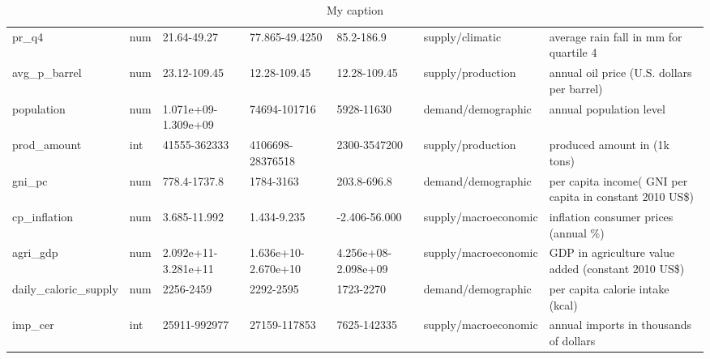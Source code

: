\documentclass[12pt,a4paper,english]{article}
\begin{document}
\begin{table}[!htbp]
\begin{adjustbox}{max width=\textwidth}
\begin{tabular}{lllllll}
pr\_q4                 & num      & 21.64-49.27         & 77.865-49.4250      & 85.2-186.9          & supply/climatic      & average rain fall in mm for quartile 4                   \\
avg\_p\_barrel         & num      & 23.12-109.45        & 12.28-109.45        & 12.28-109.45        & supply/production    & annual oil price (U.S. dollars per barrel)               \\
population             & num      & 1.071e+09-1.309e+09 & 74694-101716        & 5928-11630          & demand/demographic   & annual population level                                  \\
prod\_amount           & int      & 41555-362333        & 4106698-28376518    & 2300-3547200        & supply/production    & produced amount in (1k tons)                             \\
gni\_pc                & num      & 778.4-1737.8        & 1784-3163           & 203.8-696.8         & demand/demographic   & per capita income( GNI per capita in constant 2010 US\$) \\
cp\_inflation          & num      & 3.685-11.992        & 1.434-9.235         & -2.406-56.000       & supply/macroeconomic & inflation consumer prices (annual \%)                    \\
agri\_gdp              & num      & 2.092e+11-3.281e+11 & 1.636e+10-2.670e+10 & 4.256e+08-2.098e+09 & supply/macroeconomic & GDP in agriculture value added (constant 2010 US\$)      \\
daily\_caloric\_supply & num      & 2256-2459           & 2292-2595           & 1723-2270           & demand/demographic   & per capita calorie intake (kcal)                         \\
imp\_cer               & int      & 25911-992977        & 27159-117853        & 7625-142335         & supply/macroeconomic & annual imports in thousands of dollars                   \\  \hline

\end{tabular}

\end{adjustbox}
\caption{My caption}
\label{my-label}
\end{table}
\FloatBarrier
\end{document}
